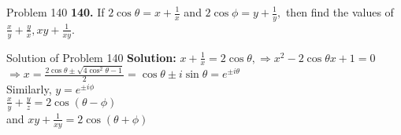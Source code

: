 \documentclass[aspectratio=169,8pt]{beamer}
\begin{document}
\begin{frame}{Problem 140}
  \textbf{140.} If $2\cos\theta = x + \frac{1}{x}$ and $2\cos\phi = y + \frac{1}{y},$ then find the values of $\frac{x}{y} +
  \frac{y}{x}, xy + \frac{1}{xy}$.
\end{frame}
\begin{frame}{Solution of Problem 140}
  \textbf{Solution:} $x + \frac{1}{x} = 2\cos\theta, \Rightarrow x^2 - 2\cos\theta x + 1 = 0$\\
  \vspace*{0.2cm}
  $\Rightarrow x = \frac{2\cos\theta \pm \sqrt{4\cos^2\theta - 1}}{2} = \cos\theta \pm i\sin\theta = e^{\pm i\theta}$\\
  \vspace*{0.2cm}
  Similarly, $y = e^{\pm i\phi}$\\
  \vspace*{0.2cm}
  $\frac{x}{y} + \frac{y}{z} = 2\cos(\theta - \phi)$\\
  \vspace*{0.2cm}
  and $xy + \frac{1}{xy} = 2\cos(\theta + \phi)$
\end{frame}
\end{document}
